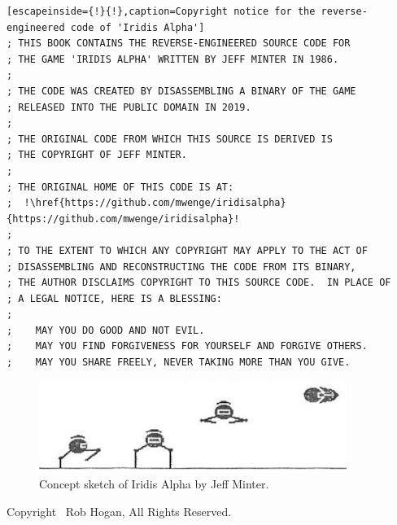 \clearpage
\lstset{style=6502Style}

\begin{lstlisting}[escapeinside={!}{!},caption=Copyright notice for the reverse-engineered code of 'Iridis Alpha']
; THIS BOOK CONTAINS THE REVERSE-ENGINEERED SOURCE CODE FOR 
; THE GAME 'IRIDIS ALPHA' WRITTEN BY JEFF MINTER IN 1986.
;
; THE CODE WAS CREATED BY DISASSEMBLING A BINARY OF THE GAME
; RELEASED INTO THE PUBLIC DOMAIN IN 2019.
;
; THE ORIGINAL CODE FROM WHICH THIS SOURCE IS DERIVED IS 
; THE COPYRIGHT OF JEFF MINTER.
;
; THE ORIGINAL HOME OF THIS CODE IS AT: 
;  !\href{https://github.com/mwenge/iridisalpha}{https://github.com/mwenge/iridisalpha}!
;
; TO THE EXTENT TO WHICH ANY COPYRIGHT MAY APPLY TO THE ACT OF 
; DISASSEMBLING AND RECONSTRUCTING THE CODE FROM ITS BINARY, 
; THE AUTHOR DISCLAIMS COPYRIGHT TO THIS SOURCE CODE.  IN PLACE OF
; A LEGAL NOTICE, HERE IS A BLESSING:
;
;    MAY YOU DO GOOD AND NOT EVIL.
;    MAY YOU FIND FORGIVENESS FOR YOURSELF AND FORGIVE OTHERS.
;    MAY YOU SHARE FREELY, NEVER TAKING MORE THAN YOU GIVE.
\end{lstlisting}

\begin{figure}[H]
    \centering
      \includegraphics[width=10cm]{src/bumph/sketch.png}%
\caption{Concept sketch of Iridis Alpha by Jeff Minter.}
\end{figure}

\vspace*{\fill}
Copyright \textcopyright\ Rob Hogan, All Rights Reserved.

\doclicenseThis
\clearpage
